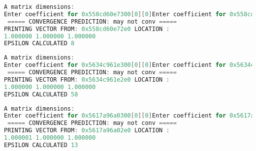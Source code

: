 \documentclass{report}
\begin{document}
\begin{lstlisting}[language=C,inputencoding=utf8, basicstyle=\fontsize{8}{10}\selectfont,caption=Execution with A3 matrix]
A matrix dimensions: 
Enter coefficient for 0x558cd60e7300[0][0]Enter coefficient for 0x558cd60e7300[0][1]Enter coefficient for 0x558cd60e7300[0][2]Enter coefficient for 0x558cd60e7300[1][0]Enter coefficient for 0x558cd60e7300[1][1]Enter coefficient for 0x558cd60e7300[1][2]Enter coefficient for 0x558cd60e7300[2][0]Enter coefficient for 0x558cd60e7300[2][1]Enter coefficient for 0x558cd60e7300[2][2]
 ===== CONVERGENCE PREDICTION: may not conv =====
PRINTING VECTOR FROM: 0x558cd60e72e0 LOCATION :
1.000000 1.000000 1.000000
EPSILON CALCULATED 8
\end{lstlisting}
\begin{lstlisting}[language=C,inputencoding=utf8, basicstyle=\fontsize{8}{10}\selectfont,caption=Execution with A4 matrix]
A matrix dimensions: 
Enter coefficient for 0x5634c961e300[0][0]Enter coefficient for 0x5634c961e300[0][1]Enter coefficient for 0x5634c961e300[0][2]Enter coefficient for 0x5634c961e300[1][0]Enter coefficient for 0x5634c961e300[1][1]Enter coefficient for 0x5634c961e300[1][2]Enter coefficient for 0x5634c961e300[2][0]Enter coefficient for 0x5634c961e300[2][1]Enter coefficient for 0x5634c961e300[2][2]
 ===== CONVERGENCE PREDICTION: may not conv =====
PRINTING VECTOR FROM: 0x5634c961e2e0 LOCATION :
1.000000 1.000000 1.000000
EPSILON CALCULATED 58
\end{lstlisting}
\begin{lstlisting}[language=C,inputencoding=utf8, basicstyle=\fontsize{8}{10}\selectfont,caption=Execution with A5 dimensions: 3x3]
A matrix dimensions: 
Enter coefficient for 0x5617a96a0300[0][0]Enter coefficient for 0x5617a96a0300[0][1]Enter coefficient for 0x5617a96a0300[0][2]Enter coefficient for 0x5617a96a0300[1][0]Enter coefficient for 0x5617a96a0300[1][1]Enter coefficient for 0x5617a96a0300[1][2]Enter coefficient for 0x5617a96a0300[2][0]Enter coefficient for 0x5617a96a0300[2][1]Enter coefficient for 0x5617a96a0300[2][2]
 ===== CONVERGENCE PREDICTION: may not conv =====
PRINTING VECTOR FROM: 0x5617a96a02e0 LOCATION :
1.000001 1.000000 1.000000
EPSILON CALCULATED 13 
\end{lstlisting}
\end{document}
